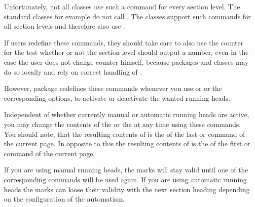   Unfortunately, not all classes use such a command for
  every section level. The standard classes for example do not call
  . The \KOMAScript{} classes support such commands for all
  section levels and therefore also use .

  If users redefine these commands, they should take care
  to also use the counter  for the test whether or not
  the section level should output a number, even in the case the user does not
  change counter  himself, because packages and classes
  may do so locally and rely on correct handling of .

  However, package  redefines these commands whenever you
  use  or  or
  the corresponding options, to activate or deactivate the wanted running
  heads.%
  \EndIndexGroup


  \begin{Declaration}
  \end{Declaration}
  Independent of whether currently manual or automatic running heads are
  active, you may change the contents of the  or the
   at any time using these commands. You should note, that
  the resulting contents of  is the
   of the last  or  command
  of the current page. In opposite to this the resulting contents of
   is the  of the first
   or  command of the current page.

  If you are using manual running heads, the marks will stay valid until one
  of the corresponding commands will be used again. If you are using automatic
  running heads the marks can loose their validity with the next section
  heading depending on the configuration of the automatism.


